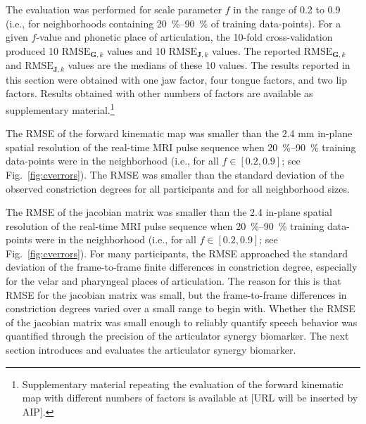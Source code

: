 \documentclass[preprint]{JASAnew}\usepackage[]{graphicx}\usepackage[]{color}
\begin{document}
The evaluation was performed for scale parameter $f$ in the range of \num{0.2} to \num{0.9} (i.e., for neighborhoods containing \SIrange{20}{90}{\percent} of training data-points).
%
For a given $f$-value and phonetic place of articulation, the 10-fold cross-validation produced \num{10} $\mathrm{RMSE}_{\mathbf{G},k}$ values and \num{10} $\mathrm{RMSE}_{\mathbf{J},k}$ values.
%
The reported $\mathrm{RMSE}_{\mathbf{G},k}$ and $\mathrm{RMSE}_{\mathbf{J},k}$ values are the medians of these \num{10} values.
%
The results reported in this section were obtained with one jaw factor, four tongue factors, and two lip factors. Results obtained with other numbers of factors are available as supplementary material.\footnote{Supplementary material repeating the evaluation of the forward kinematic map with different numbers of factors is available at [URL will be inserted by AIP].}



The RMSE of the forward kinematic map was smaller than the 2.4 mm in-plane spatial resolution of the real-time MRI pulse sequence when \SIrange{20}{90}{\percent} training data-points were in the neighborhood (i.e., for all $f\in \left[ 0.2, 0.9\right]$; see Fig.~\ref{fig:cverrors}). The RMSE was smaller than the standard deviation of the observed constriction degrees for all participants and for all neighborhood sizes.


The RMSE of the jacobian matrix was smaller than the 2.4 in-plane spatial resolution of the real-time MRI pulse sequence when \SIrange{20}{90}{\percent} training data-points were in the neighborhood (i.e., for all $f\in \left[ 0.2, 0.9\right]$; see Fig.~\ref{fig:cverrors}).
%
For many participants, the RMSE approached the standard deviation of the frame-to-frame finite differences in constriction degree, especially for the velar and pharyngeal places of articulation.
%
The reason for this is that RMSE for the jacobian matrix was small, but the frame-to-frame differences in constriction degrees varied over a small range to begin with. 
% 
Whether the RMSE of the jacobian matrix was small enough to reliably quantify speech behavior was quantified through the precision of the articulator synergy biomarker. 
% 
The next section introduces and evaluates the articulator synergy biomarker. 
\end{document}
